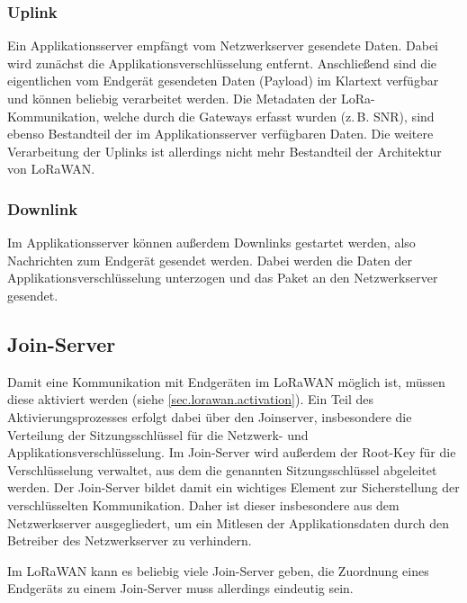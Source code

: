 \subsubsection{Uplink}
Ein Applikationsserver empfängt vom Netzwerkserver gesendete Daten.
Dabei wird zunächst die Applikationsverschlüsselung entfernt.
Anschließend sind die eigentlichen vom Endgerät gesendeten Daten (\gls{Payload}) im Klartext verfügbar und können beliebig verarbeitet werden.
Die Metadaten der LoRa-Kommunikation, welche durch die Gateways erfasst wurden (z.\,B. \gls{SNR}), sind ebenso Bestandteil der im Applikationsserver verfügbaren Daten.
Die weitere Verarbeitung der Uplinks ist allerdings nicht mehr Bestandteil der Architektur von LoRaWAN.

\subsubsection{Downlink}
Im Applikationsserver können außerdem Downlinks gestartet werden, also Nachrichten zum Endgerät gesendet werden.
Dabei werden die Daten der Applikationsverschlüsselung unterzogen und das Paket an den Netzwerkserver gesendet.


\subsection{Join-Server}
Damit eine Kommunikation mit Endgeräten im LoRaWAN möglich ist, müssen diese aktiviert werden (siehe \autoref{sec.lorawan.activation}).
Ein Teil des Aktivierungsprozesses erfolgt dabei über den \gls{Joinserver}, insbesondere die Verteilung der Sitzungsschlüssel für die Netzwerk- und Applikationsverschlüsselung.
Im Join-Server wird außerdem der Root-Key für die Verschlüsselung verwaltet, aus dem die genannten Sitzungsschlüssel abgeleitet werden.
Der Join-Server bildet damit ein wichtiges Element zur Sicherstellung der verschlüsselten Kommunikation.
Daher ist dieser insbesondere aus dem Netzwerkserver ausgegliedert, um ein Mitlesen der Applikationsdaten durch den Betreiber des Netzwerkserver zu verhindern.

Im LoRaWAN kann es beliebig viele Join-Server geben, die Zuordnung eines Endgeräts zu einem Join-Server muss allerdings eindeutig sein.



